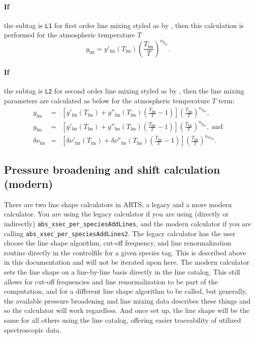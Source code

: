 \paragraph*{If} the subtag is \verb|L1| for first order line mixing styled as by \citet{tretyakov05:_60-ghz_jms}, then
this calculation is performed for the atmospheric temperature $T$
\begin{equation}
  y_{\mathrm{lm}} =  y'_{\mathrm{lm}}(T_{\mathrm{lm}})\left(\frac{T_{\mathrm{lm}}}{T}\right)^{n_{y_{\mathrm{lm}}}}.
\end{equation}

\paragraph*{If} the subtag is \verb|L2| for second order line mixing styled as by \citet{makarov11:_60-ghz_jqsrt},
then the line mixing parameters are calculated as below for the atmospheric temperature $T$
term:
\begin{eqnarray}
  y_{\mathrm{lm}}&=& \left[y'_{\mathrm{lm}}(T_{\mathrm{lm}})+y''_{\mathrm{lm}}(T_{\mathrm{lm}})\left(\frac{T_{\mathrm{lm}}}{T}-
  1\right)\right]\left(\frac{T_{\mathrm{lm}}}{T}\right)^{n_{y_{\mathrm{lm}}}},\\
  g_{\mathrm{lm}}&=& \left[g'_{\mathrm{lm}}(T_{\mathrm{lm}})+g''_{\mathrm{lm}}(T_{\mathrm{lm}})\left(\frac{T_{\mathrm{lm}}}{T}-
  1\right)\right]\left(\frac{T_{\mathrm{lm}}}{T}\right)^{n_{g_{\mathrm{lm}}}},\;\mathrm{and}\\
  \delta\nu_{\mathrm{lm}}&=& \left[\delta\nu'_{\mathrm{lm}}(T_{\mathrm{lm}})+\delta\nu''_{\mathrm{lm}}(T_{\mathrm{lm}})\left(\frac{T_{\mathrm{lm}}}{T}-
  1\right)\right]\left(\frac{T_{\mathrm{lm}}}{T}\right)^{n_{\delta\nu_{\mathrm{lm}}}}.
\end{eqnarray}

\subsection{Pressure broadening and shift calculation (modern) \label{moder_lineshapes}}
There are two line shape calculators in ARTS, a legacy and a more modern calculator.
You are using the legacy calculator if you are using (directly or indirectly)
\verb|abs_xsec_per_speciesAddLines|,
and the modern calculator if you are calling \verb|abs_xsec_per_speciesAddLines2|.
The legacy calculator has the user choose the line shape algorithm, cut-off
frequency, and line renormalization routine directly in the controlfile for a
given species tag. This is described above in this documentation and will
not be iterated upon here.
The modern calculator sets the line shape on a line-by-line basis directly in
the line catalog.  This still allows for cut-off frequencies and line renormalization
to be part of the computation, and for a different line shape algorithm to be called,
but generally, the available pressure broadening and line mixing data describes these
things and so the calculator will work regardless.  And once set up, the line shape
will be the same for all others using the line catalog, offering easier traceability
of utilized spectroscopic data.

